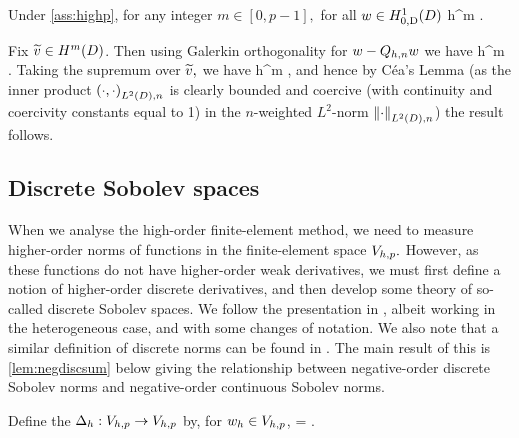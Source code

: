 
\label{lem:wltdprojerr}
Under \cref{ass:highp}, for any integer $m \in [0,p-1],$ for all $w \in \HozDD$
\beq\label{eq:wltdprojerr}
 \leq {} \frac{\nmax}{\nmin} h^{m} .
\eeq
\ele

Fix $\vtilde \in \HmD$. Then using Galerkin orthogonality for $w - Q_{h,n} w$ we have
\beqs%
 \leq {}\NLtDn{\vtilde-\Ih\vtilde}\leq {} \frac{\nmax}{\nmin} h^m \NHmDn{\vtilde}.
\eeqs%
Taking the supremum over $\widetilde{v},$ we have
\beqs
{} \leq {} \frac{\nmax}{\nmin} h^m ,
\eeqs
and hence by C\'ea's Lemma (as the inner product $\IPLtDn{\cdot}{\cdot}$ is clearly bounded and coercive (with continuity and coercivity constants equal to 1) in the $n$-weighted $L^2$-norm $\NLtDn{\cdot}$) the result follows.
\epf

\subsection{Discrete Sobolev spaces}\label{sec:discsob}
When we analyse the high-order finite-element method, we need to measure higher-order norms of functions in the finite-element space $V_{h,p}.$ However, as these functions do not have higher-order weak derivatives, we must first define a notion of higher-order discrete derivatives, and then develop some theory of so-called discrete Sobolev spaces. We follow the presentation in \cite{DuWu:15}, albeit working in the heterogeneous case, and with some changes of notation. We also note that a similar definition of discrete norms can be found in \cite[p. 238 ff.]{Br:07}. The main result of this  is \cref{lem:negdiscsum} below giving the relationship between negative-order discrete Sobolev norms and negative-order continuous Sobolev norms.

Define the  $\Delta_{h}:V_{h,p}\rightarrow V_{h,p}$ by, for $w_{h} \in V_{h,p}$,
\beq\label{eq:discderdef}
\IPLtDn{\Deltah \wh}{\vh} =  \tforall \vh \in \Vhp.
\eeq
\ede

